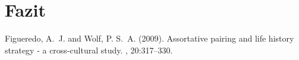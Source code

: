 \documentclass[12pt]{article} %
\begin{document}








\section{Fazit} %



\begin{thebibliography}{99} %

Figueredo, A.~J. and Wolf, P. S.~A. (2009).
\newblock Assortative pairing and life history strategy - a cross-cultural
  study.
, 20:317--330.
 
\end{thebibliography}

\end{document}

